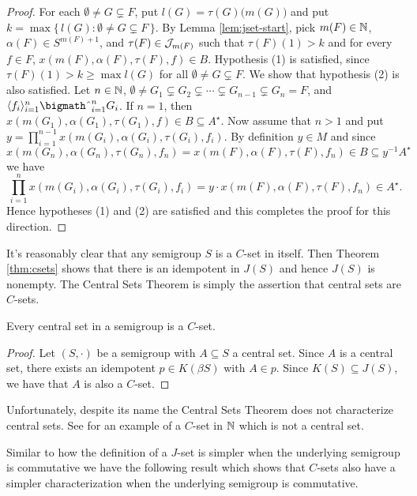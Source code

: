 \begin{proof}
  For each $\emptyset \ne G \subsetneq F$, put $l(G) = \tau(G)\bigl( m(G) \bigr)$ and put $k = \max\{\, l(G) : \emptyset \ne G \subsetneq F \,\}$.
  By Lemma \ref{lem:jset-start}, pick $m(F) \in \mathbb{N}$, $\alpha(F) \in S^{m(F)+1}$, and $\tau(F) \in \mathcal{J}_{m(F)}$ such that $\tau(F)(1) > k$ and for every $f \in F$, $x(m(F), \alpha(F), \tau(F), f) \in B$.
  Hypothesis (1) is satisfied, since $\tau(F)(1) > k \ge \max l(G)$ for all $\emptyset \ne G \subsetneq F$.
  We show that hypothesis (2) is also satisfied.
  Let $n \in \mathbb{N}$, $\emptyset \ne G_1 \subsetneq G_2 \subsetneq \cdots \subsetneq G_{n-1} \subsetneq G_n = F$, and $\la f_i \ra_{i=1}^n \bigtimes_{i=1}^n G_i$. 
  If $n = 1$, then $x(m(G_1), \alpha(G_1), \tau(G_1), f) \in B \subseteq A^\star$.
  Now assume that $n > 1$ and put $y = \prod_{i=1}^{n-1} x(m(G_i), \alpha(G_i), \tau(G_i), f_i)$. 
  By definition $y \in M$ and since $x(m(G_n), \alpha(G_n), \tau(G_n), f_n) = x(m(F), \alpha(F), \tau(F), f_n) \in B \subseteq y^{-1}A^\star$ we have
  \[
    \textstyle
    \prod_{i=1}^n x(m(G_i), \alpha(G_i), \tau(G_i), f_i) = y \cdot x(m(F), \alpha(F), \tau(F), f_n) \in A^\star.
  \]
  Hence hypotheses (1) and (2) are satisfied and this completes the proof for this direction.
\end{proof}

It's reasonably clear that any semigroup $S$ is a $C$-set in itself.
Then Theorem \ref{thm:csets} shows that there is an idempotent in $J(S)$ and hence $J(S)$ is nonempty.
The Central Sets Theorem is simply the assertion that central sets are $C$-sets. 

\begin{cor}
  \label{cor:cst}
  Every central set in a semigroup is a $C$-set.
\end{cor}
\begin{proof}
  Let $(S, \cdot)$ be a semigroup with $A \subseteq S$ a central set. 
  Since $A$ is a central set, there exists an idempotent $p \in K(\beta S)$ with $A \in p$.
  Since $K(S) \subseteq J(S)$, we have that $A$ is also a $C$-set.
\end{proof}
\begin{rmk}
  Unfortunately, despite its name the Central Sets Theorem does not characterize central sets. 
  See \cite{Hindman:2007fk} for an example of a $C$-set in $\mathbb{N}$ which is not a central set.   
\end{rmk}

Similar to how the definition of a $J$-set is simpler when the underlying semigroup is commutative we have the following result which shows that $C$-sets also have a simpler characterization when the underlying semigroup is commutative. 

